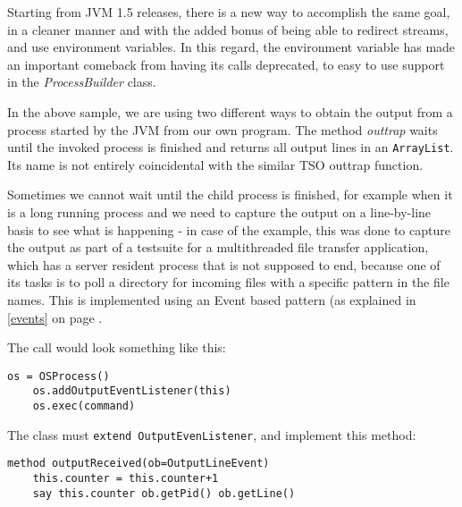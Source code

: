 {Starting from JVM 1.5 releases, there is a new way to accomplish the
same goal, in a cleaner manner and with the added bonus of being able
to redirect streams, and use environment variables. In this regard,
the environment variable has made an important comeback from having
its calls deprecated, to easy to use support in the
\emph{ProcessBuilder} class. 
 
In the above sample, we are using two different ways to obtain the
output from a process started by the JVM from our own program. The
method \emph{outtrap} waits until the invoked process is finished and
returns all output lines in an \texttt{ArrayList}. Its name is not
entirely coincidental with the similar TSO outtrap function. 

Sometimes we cannot wait until the child process is finished, for
example when it is a long running process and we need to capture the
output on a line-by-line basis to see what is happening - in case of
the example, this was done to capture the output as part of a
testsuite for a multithreaded file transfer application, which has a
server resident process that is not supposed to end, because one of
its tasks is to poll a directory for incoming files with a specific
pattern in the file names. This is implemented using an Event based
pattern (as explained in \ref{events}  on page \pageref{events}. 
 

 

The call would look something like this:
\begin{lstlisting}[label=callosprocessexample,caption=Example of calling the OSProcess class - registering an eventhandler]
    os = OSProcess()
    os.addOutputEventListener(this)
    os.exec(command)
\end{lstlisting}

The class must \texttt{extend OutputEvenListener}, and implement this
method:

\begin{lstlisting}[label=registerhandlerexample,caption=Example of implementing the listener method]
  method outputReceived(ob=OutputLineEvent)
    this.counter = this.counter+1
    say this.counter ob.getPid() ob.getLine()
\end{lstlisting}

}
